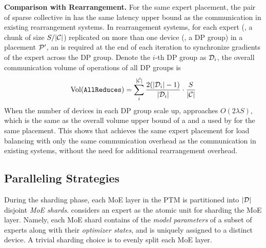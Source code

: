 \textbf{Comparison with Rearrangement.} 
For the same expert placement, the pair of sparse collective in \yyy has the same latency upper bound as the \collar communication in existing rearrangement systems.
In rearrangement systems, for each expert (\ie, a chunk of size $S/|\mathcal{C}|$) replicated on more than one device (\ie, a DP group) in a placement $\mathcal{P}'$, an \collar is required at the end of each iteration to synchronize gradients of the expert across the DP group.
Denote the $i$-th DP group as $\mathcal{D}_i$, the overall communication volume of \collar operations of all DP groups is
\begin{equation}\label{eq:val_ars}
    \text{Vol}(\texttt{{\texttt{AllReduce}}s}) = 
    \sum_{i}^{|\mathcal{\hat{C}}|} \frac{2(|\mathcal{D}_i| - 1)}{|\mathcal{D}_i|} \cdot \frac{S}{|\mathcal{C}|}
\end{equation}
When the number of devices in each DP group scale up,  approaches $O(2\lambda S)$, which is the same as the overall volume upper bound of a  and a  used by \yyy for the same placement. This shows that \yyy achieves the same expert placement for load balancing with only the same communication overhead as the \collar communication in existing systems, without the need for additional rearrangement overhead.









\subsection{Paralleling Strategies}

During the sharding phase, each MoE layer in the PTM is partitioned into $|\mathcal{D}|$ disjoint \textit{MoE shards}. %
\yyy considers an expert as the atomic unit for sharding the MoE layer. Namely, each MoE shard contains of the \textit{model parameters} of a subset of experts along with their \textit{optimizer states}, and is uniquely assigned to a distinct device. 
A trivial sharding choice is to evenly split each MoE layer.

